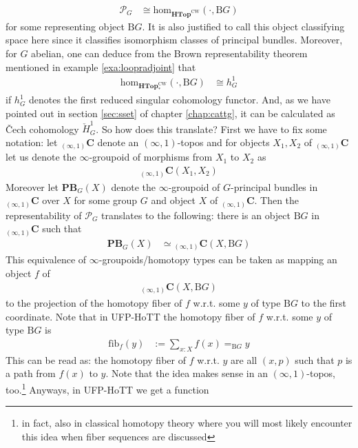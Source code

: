 \begin{align*}
  \mathcal{P}_{G}
  &\cong
  \mathrm{hom}_{\mathbf{HTop}^{\textrm{CW}}}(\cdot,\mathrm{B}G)
\end{align*}
for some representing object $\mathrm{B}G$. It is also justified to call this object classifying space here since it classifies isomorphism classes of principal bundles. Moreover, for $G$ abelian, one can deduce from the Brown representability theorem mentioned in example \ref{exa:loopradjoint} that
\begin{align*}
  \mathrm{hom}_{\mathbf{HTop}_{\ast}^{\textrm{CW}}}(\cdot,\mathrm{B}G)
  &\cong
  h_{G}^{1}
\end{align*}
if $h_{G}^{1}$ denotes the first reduced singular cohomology functor. And, as we have pointed out in section \ref{sec:sset} of chapter \ref{chap:cattg}, it can be calculated as \v{C}ech cohomology $\check{H}_{G}^{1}$. So how does this translate? First we have to fix some notation: let ${}_{(\infty,1)}\mathbf{C}$ denote an $(\infty,1)$-topos and for objects $X_{1},X_{2}$ of ${}_{(\infty,1)}\mathbf{C}$ let us denote the $\infty$-groupoid of morphisms from $X_{1}$ to $X_{2}$ as
\begin{align*}
  {}_{(\infty,1)}\mathbf{C}
  \left(
    X_{1},
    X_{2}
  \right)
\end{align*}
Moreover let $\mathbf{PB}_{G}(X)$ denote the $\infty$-groupoid of $G$-principal bundles in ${}_{(\infty,1)}\mathbf{C}$ over $X$ for some group $G$ and object $X$ of ${}_{(\infty,1)}\mathbf{C}$. Then the representability of $\mathcal{P}_{G}$ translates to the following: there is an object $\mathrm{B}G$ in ${}_{(\infty,1)}\mathbf{C}$ such that
\begin{align*}
  \mathbf{PB}_{G}(X)
  &\simeq
  {}_{(\infty,1)}\mathbf{C}
  \left(
    X,
    \mathrm{B}G
  \right)
\end{align*}
This equivalence of $\infty$-groupoids/homotopy types can be taken as mapping an object $f$ of
\begin{align*}
  {}_{(\infty,1)}\mathbf{C}
  \left(
    X,
    \mathrm{B}G
  \right)
\end{align*}
to the projection of the homotopy fiber of $f$ w.r.t. some $y$ of type $\mathrm{B}G$ to the first coordinate. Note that in UFP-HoTT the homotopy fiber of $f$ w.r.t. some $y$ of type $\mathrm{B}G$ is
\begin{align*}
  \mathrm{fib}_{f}(y)
  &:=
  \sum_{x \colon X}
  f(x)
  =_{\mathrm{B}G}
  y
\end{align*}
This can be read as: the homotopy fiber of $f$ w.r.t. $y$ are all $(x,p)$ such that $p$ is a path from $f(x)$ to $y$. Note that the idea makes sense in an $(\infty,1)$-topos, too.\footnote{in fact, also in classical homotopy theory where you will most likely encounter this idea when fiber sequences are discussed} Anyways, in UFP-HoTT we get a function
